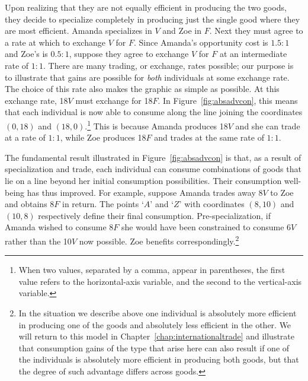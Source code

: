 

\newhtmlpage

Upon realizing that they are not equally efficient in producing the two
goods, they decide to specialize completely in producing just the single
good where they are most efficient. Amanda specializes in $V$ and Zoe in $F$. 
Next they must agree to a rate at which to exchange $V$ for $F$. Since
Amanda's opportunity cost is $1.5:1$ and Zoe's is $0.5:1$, suppose they
agree to exchange $V$ for $F$ at an intermediate rate of $1:1$. There are
many trading, or exchange, rates possible; our purpose is to illustrate that
gains are possible for \textit{both} individuals at some exchange rate. The
choice of this rate also makes the graphic as simple as possible. At this
exchange rate, 18$V$ must exchange for 18$F$. In Figure~\ref{fig:absadvcon},
this means that each individual is now able to consume along the line
joining the coordinates $(0,18)$ and $(18,0)$.\footnote{When two values, separated by 
a comma, appear in parentheses, the first value refers to the horizontal-axis
variable, and the second to the vertical-axis variable.} This is because Amanda produces 18$V$
and she can trade at a rate of $1:1$, while Zoe produces 18$F$ and trades at
the same rate of $1:1$.

The fundamental result illustrated in Figure~\ref{fig:absadvcon} is that,
as a result of specialization and trade, each individual can consume
combinations of goods that lie on a line beyond her initial consumption
possibilities.  Their consumption well-being has thus improved. For example,
suppose Amanda trades away 8$V$ to Zoe and obtains 8$F$ in return. The
points `$A$' and `$Z$' with coordinates $(8,10)$ and $(10,8)$
respectively define their final consumption. Pre-specialization, if Amanda
wished to consume 8$F$ she would have been constrained to consume 6$V$
rather than the 10$V$ now possible. Zoe benefits correspondingly.\footnote{
	In the situation we describe above one individual is absolutely more
	efficient in producing one of the goods and absolutely less efficient in the
	other. We will return to this model in Chapter~\ref{chap:internationaltrade}
	and illustrate that consumption gains of the type that arise here can also
	result if one of the individuals is absolutely more efficient in producing
	both goods, but that the degree of such advantage differs across goods.}
